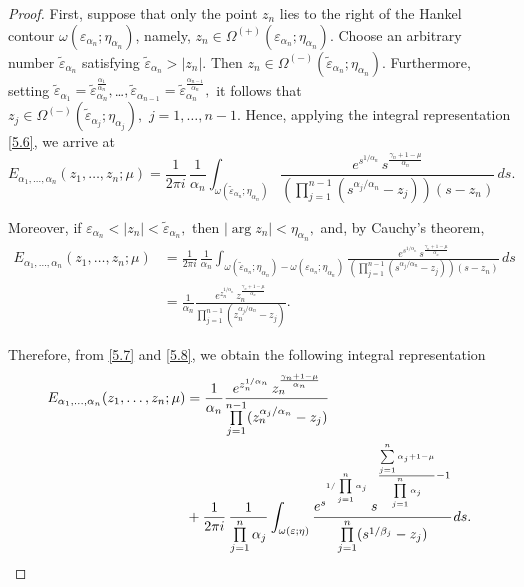 \documentclass[12pt, reqno]{amsart}
\theoremstyle{definition}
\theoremstyle{remark}
\numberwithin{equation}{section}
\begin{document}
\begin{proof}
    First, suppose that only the point $z_n$ lies to the right of the Hankel contour
$\omega(\varepsilon_{\alpha_n};\eta_{\alpha_n})$, namely,
$
z_n\in\Omega^{(+)}(\varepsilon_{\alpha_n};\eta_{\alpha_n}).
$
Choose an arbitrary number $\widetilde{\varepsilon}_{\alpha_n}$ satisfying
$\widetilde{\varepsilon}_{\alpha_n}>|z_n|$. Then
$
z_n\in\Omega^{(-)}(\widetilde{\varepsilon}_{\alpha_n};\eta_{\alpha_n}).
$
Furthermore, setting
$
\widetilde{\varepsilon}_{\alpha_1}
=\widetilde{\varepsilon}_{\alpha_n}^{\frac{\alpha_1}{\alpha_n}},
$\dots$,
\widetilde{\varepsilon}_{\alpha_{n-1}}
=\widetilde{\varepsilon}_{\alpha_n}^{\frac{\alpha_{n-1}}{\alpha_n}},
$
it follows that
$
z_j\in\Omega^{(-)}(\widetilde{\varepsilon}_{\alpha_j};\eta_{\alpha_j}),
\,\,
j=1,\dots,n-1.
$
Hence, applying the integral representation \eqref{5.6}, we arrive at
\begin{equation}\label{5.7}E_{\alpha_1,\dots,\alpha_n}(z_1,\dots,z_n;\mu)=
\frac{1}{2\pi i}\,
\frac{1}{\alpha_n}
\int_{\omega(\widetilde{\varepsilon}_{\alpha_n};\eta_{\alpha_n})}
\frac{
e^{s^{1/\alpha_n}}
\,s^{\frac{\gamma_n+1-\mu}{\alpha_n}}
}
{
\left(\prod\limits_{j=1}^{n-1}(s^{\alpha_j/\alpha_n}-z_j)\right)(s-z_n)
}
\,ds.\end{equation}

Moreover, if
$
\varepsilon_{\alpha_n}<|z_n|<\widetilde{\varepsilon}_{\alpha_n},
$
then
$
|\arg z_n|<\eta_{\alpha_n},
$
and, by Cauchy's theorem,
\begin{equation}\label{5.8}\begin{aligned}
E_{\alpha_1,\dots,\alpha_n}(z_1,\dots,z_n;\mu)&=
\frac{1}{2\pi i}\,
\frac{1}{\alpha_n}
\int_{\omega(\widetilde{\varepsilon}_{\alpha_n};\eta_{\alpha_n})-\omega(\varepsilon_{\alpha_n};\eta_{\alpha_n})}
\frac{
e^{s^{1/\alpha_n}}
\,s^{\frac{\gamma_n+1-\mu}{\alpha_n}}
}
{
\left(\prod\limits_{j=1}^{n-1}(s^{\alpha_j/\alpha_n}-z_j)\right)(s-z_n)
}
\,ds\\
&=\frac{1}{\alpha_n}
\frac{
e^{z_n^{1/\alpha_n}}
\,z_n^{\frac{\gamma_n+1-\mu}{\alpha_n}}}
{\prod\limits_{j=1}^{n-1}(z_n^{\alpha_j/\alpha_n}-z_j)}.\end{aligned}
\end{equation}

Therefore, from \eqref{5.7} and \eqref{5.8}, we obtain the following integral representation 
\begin{equation}\label{5.9}\begin{aligned}
E_{\alpha_1,\dots,\alpha_n}(z_1,\dots,z_n;\mu)
&=\frac{1}{\alpha_n}
\frac{
e^{z_n^{1/\alpha_n}}
\,z_n^{\frac{\gamma_n+1-\mu}{\alpha_n}}}
{\prod\limits_{j=1}^{n-1}(z_n^{\alpha_j/\alpha_n}-z_j)}\\
&+
\frac{1}{2\pi i}\,
\frac{1}{\prod\limits_{{j=1}}^n\alpha_j}
\int_{\omega(\varepsilon;\eta)}
\cfrac{
e^{s^{1/\prod\limits_{{j=1}}^n\alpha_j}}
\,s^{\frac{\sum\limits_{j=1}^n\alpha_j+1-\mu}{\prod\limits_{j=1}^n\alpha_j}-1}
}
{
\prod\limits_{j=1}^n(s^{1/\beta_j}-z_j)
}
\,ds.\end{aligned}\end{equation}


\end{proof}
\end{document}

